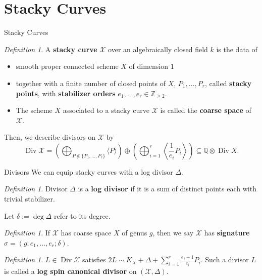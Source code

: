 \documentclass{beamer}
\theoremstyle{remark}
\newtheorem{defn}[thm]{Definition}
\newcommand\BQ{{\mathbb Q}}
\newcommand\BZ{{\mathbb Z}}
\newcommand \sx{{\mathscr X}}
\DeclareMathOperator\di{Div}
\newcommand{\halfcan}{L}
\begin{document}
\section{Stacky Curves}

\begin{frame}{Stacky Curves}
\begin{defn}
A \textbf{stacky curve} $\sx$ over an algebraically closed field $k$
is the data of
	\begin{itemize}
		\item smooth proper connected scheme $X$ of dimension $1$ \\ 
		\item together with a finite number of closed points of $X$, $P_
			1, \ldots, P_r$, called {\bf stacky points}, with {\bf stabilizer 
			orders} $e_1, \ldots, e_r \in \BZ_{\geq 2}.$ \\ 
		\item The scheme $X$ associated to a stacky curve $\sx$ is 
			called the {\bf coarse space} of $\sx$.
	\end{itemize}
\end{defn}

\pause

Then, we describe divisors on $\sx$ by
\[
	\di \sx = \left(\bigoplus_{P\notin \{P_1, \ldots, P_r\}} \langle 
	P \rangle \right) \oplus \left(\bigoplus_{i = 1}^r \left \langle 
	\frac{1}{e_i}P_i \right \rangle \right) \subseteq \BQ \otimes \di X.
\]

\end{frame}


\begin{frame}{Divisors}
We can equip stacky curves with a log divisor $\Delta$.

\begin{defn}
Divisor $\Delta$ is a \textbf{log divisor} if it is a sum of distinct
points each with trivial stabilizer.

Let $\delta := \deg \Delta$ refer to its degree.
\end{defn}

\pause
\begin{defn}
If $\sx$ has coarse space $X$ of genus $g$, then we say $\sx$ has
\textbf{signature} $\sigma = (g; e_1, \ldots, e_r; \delta)$.
\end{defn}

\pause
\begin{defn}
$\halfcan \in \di
\sx$ satisfies $2 \halfcan \sim K_X + \Delta + \sum_{i = 1}^{r}
\frac{e_i - 1}{e_i} P_i$. Such a divisor $\halfcan$ is called a
\textbf{log spin canonical divisor} on $(\sx, \Delta)$.
\end{defn}

\end{frame}
\end{document}
